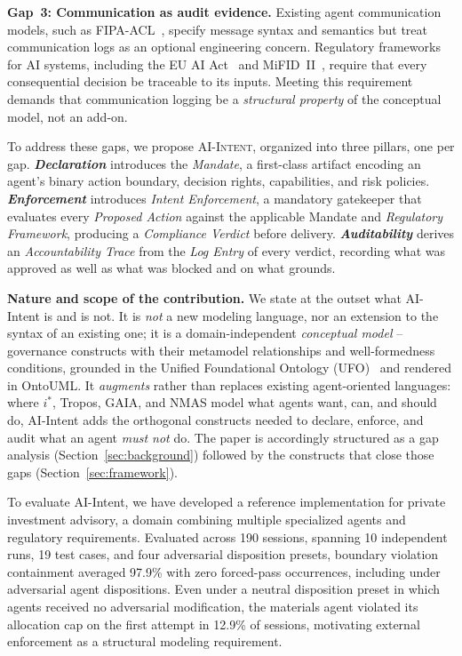 \documentclass[runningheads]{llncs}
\begin{document}
\medskip
\noindent\textbf{Gap~3: Communication as audit evidence.} Existing agent
communication models, such as FIPA-ACL~\cite{fipa2002}, specify message
syntax and semantics but treat communication logs as an optional
engineering concern. Regulatory frameworks for AI systems, including
the EU AI Act~\cite{euaiact2024} and MiFID~II~\cite{mifid2014}, require
that every consequential decision be traceable to its inputs. Meeting
this requirement demands that communication logging be a \emph{structural
property} of the conceptual model, not an add-on.

\medskip
To address these gaps, we propose \textsc{AI-Intent}, organized into
three pillars, one per gap. \textbf{\textit{Declaration}} introduces the
\textit{Mandate}, a first-class artifact encoding an agent's binary action
boundary, decision rights, capabilities, and risk policies.
\textbf{\textit{Enforcement}} introduces \textit{Intent Enforcement}, a
mandatory gatekeeper that evaluates every \textit{Proposed Action} against
the applicable Mandate and \textit{Regulatory Framework}, producing a
\textit{Compliance Verdict} before delivery. \textbf{\textit{Auditability}}
derives an \textit{Accountability Trace} from the \textit{Log Entry} of
every verdict, recording what was approved as well as what was blocked and
on what grounds.

\noindent\textbf{Nature and scope of the contribution.} We state at the
outset what AI-Intent is and is not. It is \emph{not} a new modeling
language, nor an extension to the syntax of an existing one; it is a
domain-independent \emph{conceptual model} -- governance constructs with
their metamodel relationships and well-formedness conditions, grounded in
the Unified Foundational Ontology (UFO)~\cite{guizzardi2005ontological}
and rendered in OntoUML. It \emph{augments} rather than replaces existing
agent-oriented languages: where $i^*$, Tropos, GAIA, and NMAS model what
agents want, can, and should do, AI-Intent adds the orthogonal constructs
needed to declare, enforce, and audit what an agent \emph{must not} do.
The paper is accordingly structured as a gap analysis
(Section~\ref{sec:background}) followed by the constructs that close those
gaps (Section~\ref{sec:framework}).

To evaluate AI-Intent, we have developed a reference implementation for private
investment advisory, a domain combining multiple
specialized agents and regulatory requirements.
Evaluated across 190 sessions, spanning 10
independent runs, 19 test cases, and four adversarial disposition
presets, boundary violation containment averaged 97.9\% with zero
forced-pass occurrences, including under adversarial agent dispositions.
Even under a neutral disposition preset in which agents received
no adversarial modification, the materials agent violated its allocation
cap on the first attempt in 12.9\% of sessions, motivating external
enforcement as a structural modeling requirement.
\end{document}
